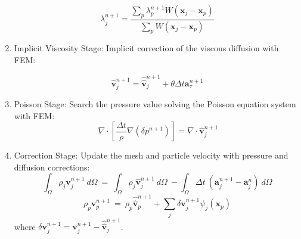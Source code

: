 \begin{enumerate}
\begin{equation}\label{Step3b}
\displaystyle \lambda^{n+1}_{j}=\frac{\sum_{p} \lambda^{n+1}_{p} W(\mathbf{x}_{j}-\mathbf{x}_{p})}{\sum_{p} W(\mathbf{x}_{j}-\mathbf{x}_{p})}
\end{equation}

  \item Implicit Viscosity Stage: Implicit correction of the viscous diffusion with FEM:

 \begin{equation}\label{Step4a}
\displaystyle \widehat{\mathbf{v}}^{n+1}_{j}=\widehat{\widehat{\mathbf{v}}}^{n+1}_{j} + \theta \Delta t \mathbf{a}^{n+1}_{\tau}
\end{equation}

 \item Poisson Stage: Search the pressure value solving the Poisson equation system with FEM:
 \begin{equation}\label{Step5a}
  \ \nabla \cdot [\frac{\Delta t}{\rho}\nabla(\delta p^{n+1})] = \nabla \cdot \widehat{\mathbf{v}}_j^{n+1}
 \end{equation}

 \item Correction Stage: Update the mesh and particle velocity with pressure and diffusion corrections:
 \begin{equation}\label{Step6a}
  \int_{\Omega} \rho_j \mathbf{v}_j^{n+1}\ d\Omega \ = \ \int_{\Omega} \rho_j  \widehat{\mathbf{v}}_j^{n+1}\ d\Omega\ - \int_{\Omega} \Delta t \ (\mathbf{a}_j^{n+1} - \mathbf{a}_j^{n})\ d\Omega
 \end{equation}
  \begin{equation}\label{Step6b}
  \rho_p \mathbf{v}_p^{n+1}\  = \ \rho_p \widehat{\widehat{\mathbf{v}}}_p^{n+1} + \sum_{j} \delta \mathbf{v}_j^{n+1} \psi_j(\mathbf{x}_{p})
  \end{equation}
  where $\delta \mathbf{v}_j^{n+1} = \mathbf{v}_j^{n+1}-\widehat{\widehat{\mathbf{v}}}_j^{n+1}$.

\end{enumerate}